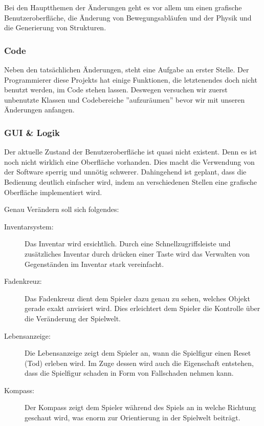 \documentclass{article}
\begin{document}
Bei den Hauptthemen der Änderungen geht es vor allem um einen grafische Benutzeroberfläche, die Änderung von Bewegungsabläufen und der Physik und die Generierung von Strukturen.

\subsubsection{Code}

Neben den tatsächlichen Änderungen, steht eine Aufgabe an erster Stelle. Der Programmierer diese Projekts hat einige Funktionen, die letztenendes doch nicht benutzt werden, im Code stehen lassen. Deswegen versuchen wir zuerst unbenutzte Klassen und Codebereiche ''aufzuräumen'' bevor wir mit unseren Änderungen anfangen.

\subsubsection{GUI \& Logik}

Der aktuelle Zustand der Benutzeroberfläche ist quasi nicht existent. Denn es ist noch nicht wirklich eine Oberfläche vorhanden. Dies macht die Verwendung von der Software sperrig und unnötig schwerer. Dahingehend ist geplant, dass die Bedienung deutlich einfacher wird, indem an verschiedenen Stellen eine grafische Oberfläche implementiert wird.

Genau Verändern soll sich folgendes:

\begin{description}
  \item[Inventarsystem:] Das Inventar wird ersichtlich. Durch eine Schnellzugriffsleiste und zusätzliches Inventar durch drücken einer Taste wird das Verwalten von Gegenständen im Inventar stark vereinfacht.
  \item[Fadenkreuz:] Das Fadenkreuz dient dem Spieler dazu genau zu sehen, welches Objekt gerade exakt anvisiert wird. Dies erleichtert dem Spieler die Kontrolle über die Veränderung der Spielwelt.
  \item[Lebensanzeige:] Die Lebensanzeige zeigt dem Spieler an, wann die Spielfigur einen Reset (Tod) erleben wird. Im Zuge dessen wird auch die Eigenschaft entstehen, dass die Spielfigur schaden in Form von Fallschaden nehmen kann.
  \item[Kompass:] Der Kompass zeigt dem Spieler während des Spiels an in welche Richtung geschaut wird, was enorm zur Orientierung in der Spielwelt beiträgt.
\end{description}
\end{document}
